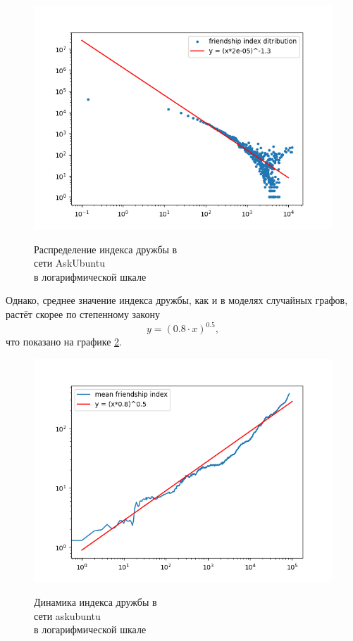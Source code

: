 \documentclass[bachelor, och, diploma]{SCWorks}
\begin{document}
\begin{figure}[!ht]
\centering
\includegraphics[scale=0.7]{diploma_results/static_real_log/sx-askubuntu.png}\\
\caption{Распределение индекса дружбы  в\\ сети AskUbuntu\\ в логарифмической шкале}\label{fig:aus}
\end{figure}

Однако, среднее значение индекса дружбы, как и в моделях случайных графов, растёт скорее по степенному закону 
\[
y = (0.8 \cdot x)^{0.5},
\]
что показано на графике \ref{fig:aud}.
\begin{figure}[!ht]
\centering
\includegraphics[scale=0.7]{diploma_results/dynamic_real_log/sx-askubuntu_mean.png}\\
\caption{Динамика индекса дружбы  в\\ сети askubuntu\\ в логарифмической шкале}\label{fig:aud}
\end{figure}
\end{document}
